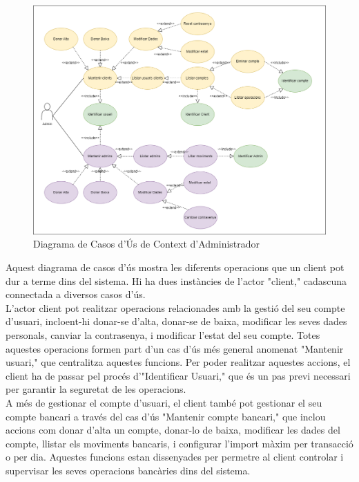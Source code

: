 \documentclass[a4paper,12pt,twoside]{ThesisStyle}
\begin{document}
\begin{figure}[h]
    \centering
    \includegraphics[width=1\textwidth]{imatges/diagrama caso de uso admin.png}
    \caption{ Diagrama de Casos d'Ús de Context d'Administrador }
    \label{fig:Diagrama de Casos d'Ús de Context d'Administrador}
\end{figure}

Aquest diagrama de casos d'ús mostra les diferents operacions que un client pot dur a terme dins del sistema. Hi ha dues instàncies de l'actor "client," cadascuna connectada a diversos casos d'ús.\\



L'actor client pot realitzar operacions relacionades amb la gestió del seu compte d'usuari, incloent-hi donar-se d'alta, donar-se de baixa, modificar les seves dades personals, canviar la contrasenya, i modificar l'estat del seu compte. Totes aquestes operacions formen part d'un cas d'ús més general anomenat "Mantenir usuari," que centralitza aquestes funcions. Per poder realitzar aquestes accions, el client ha de passar pel procés d'"Identificar Usuari," que és un pas previ necessari per garantir la seguretat de les operacions.\\

A més de gestionar el compte d'usuari, el client també pot gestionar el seu compte bancari a través del cas d'ús "Mantenir compte bancari," que inclou accions com donar d'alta un compte, donar-lo de baixa, modificar les dades del compte, llistar els moviments bancaris, i configurar l'import màxim per transacció o per dia. Aquestes funcions estan dissenyades per permetre al client controlar i supervisar les seves operacions bancàries dins del sistema.\\
\end{document}
